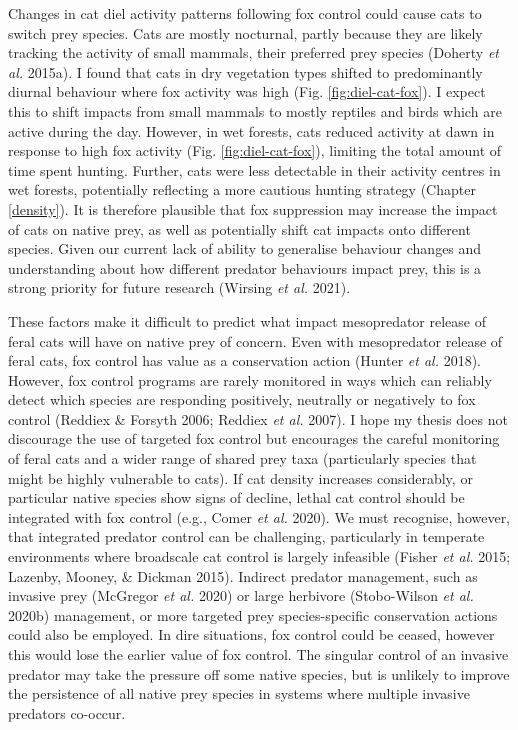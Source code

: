 \documentclass[11pt,a4paper,titlepage,twoside,openright]{style/unimelbthesis}
\begin{document}
\begin{mainmatter}
Changes in cat diel activity patterns following fox control could cause cats to switch prey species. Cats are mostly nocturnal, partly because they are likely tracking the activity of small mammals, their preferred prey species (Doherty \emph{et al.} 2015a). I found that cats in dry vegetation types shifted to predominantly diurnal behaviour where fox activity was high (Fig. \ref{fig:diel-cat-fox}). I expect this to shift impacts from small mammals to mostly reptiles and birds which are active during the day. However, in wet forests, cats reduced activity at dawn in response to high fox activity (Fig. \ref{fig:diel-cat-fox}), limiting the total amount of time spent hunting. Further, cats were less detectable in their activity centres in wet forests, potentially reflecting a more cautious hunting strategy (Chapter \ref{density}). It is therefore plausible that fox suppression may increase the impact of cats on native prey, as well as potentially shift cat impacts onto different species. Given our current lack of ability to generalise behaviour changes and understanding about how different predator behaviours impact prey, this is a strong priority for future research (Wirsing \emph{et al.} 2021).

These factors make it difficult to predict what impact mesopredator release of feral cats will have on native prey of concern. Even with mesopredator release of feral cats, fox control has value as a conservation action (Hunter \emph{et al.} 2018). However, fox control programs are rarely monitored in ways which can reliably detect which species are responding positively, neutrally or negatively to fox control (Reddiex \& Forsyth 2006; Reddiex \emph{et al.} 2007). I hope my thesis does not discourage the use of targeted fox control but encourages the careful monitoring of feral cats and a wider range of shared prey taxa (particularly species that might be highly vulnerable to cats). If cat density increases considerably, or particular native species show signs of decline, lethal cat control should be integrated with fox control (e.g., Comer \emph{et al.} 2020). We must recognise, however, that integrated predator control can be challenging, particularly in temperate environments where broadscale cat control is largely infeasible (Fisher \emph{et al.} 2015; Lazenby, Mooney, \& Dickman 2015). Indirect predator management, such as invasive prey (McGregor \emph{et al.} 2020) or large herbivore (Stobo-Wilson \emph{et al.} 2020b) management, or more targeted prey species-specific conservation actions could also be employed. In dire situations, fox control could be ceased, however this would lose the earlier value of fox control. The singular control of an invasive predator may take the pressure off some native species, but is unlikely to improve the persistence of all native prey species in systems where multiple invasive predators co-occur.


\end{mainmatter}
\end{document}
